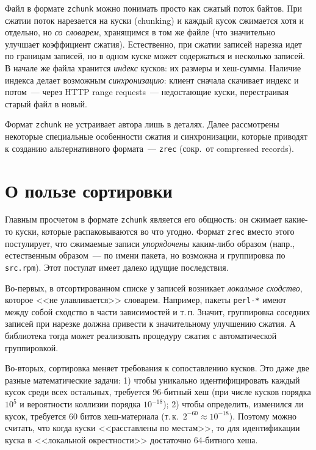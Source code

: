 \documentclass[russian,a4paper,12pt]{article}
\begin{document}
Файл в формате \verb|zchunk| можно понимать просто как сжатый поток байтов.  При сжатии поток нарезается на куски (chunking)
и каждый кусок сжимается хотя и отдельно, но \textit{со словарем}, хранящимся в том же файле (что значительно улучшает
коэффициент сжатия).  Естественно, при сжатии записей нарезка идет по границам записей, но в одном куске может содержаться
и несколько записей.  В начале же файла хранится \textit{индекс} кусков: их размеры и хеш-суммы.  Наличие индекса делает
возможным \textit{синхронизацию}: клиент сначала скачивает индекс и потом~--- через HTTP range requests~--- недостающие
куски, перестраивая старый файл в новый.

Формат \verb|zchunk| не устраивает автора лишь в деталях.  Далее рассмотрены некоторые специальные особенности сжатия
и синхронизации, которые приводят к созданию альтернативного формата~--- \verb|zrec| (сокр.~от compressed records).

\section{О пользе сортировки}
Главным просчетом в формате \verb|zchunk| является его общность: он сжимает какие-то куски, которые распаковываются
во что угодно.  Формат \verb|zrec| вместо этого постулирует, что сжимаемые записи \textit{упорядочены} каким-либо образом
(напр., естественным образом~--- по имени пакета, но возможна и группировка по \verb|src.rpm|).
Этот постулат имеет далеко идущие последствия.

Во-первых, в отсортированном списке у записей возникает \textit{локальное сходство}, которое <<не улавливается>> словарем.
Например, пакеты \verb|perl-*| имеют между собой сходство в части зависимостей и т.\,п.  Значит, группировка соседних
записей при нарезке должна привести к значительному улучшению сжатия.  А библиотека тогда может реализовать
процедуру сжатия с автоматической группировкой.

Во-вторых, сортировка меняет требования к сопоставлению кусков.  Это даже две разные математические задачи:
1) чтобы уникально идентифицировать каждый кусок среди всех остальных, требуется 96-битный хеш (при числе кусков порядка $10^5$
и вероятности коллизии порядка $10^{-18}$); 2) чтобы определить, изменился ли кусок, требуется 60 битов хеш-материала
(т.\,к.~$2^{-60}\approx10^{-18}$).  Поэтому можно считать, что когда куски <<расставлены по местам>>, то для идентификации
куска в <<локальной окрестности>> достаточно 64-битного хеша.
\end{document}
